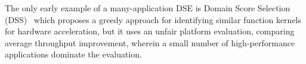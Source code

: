 The only early example of a many-application DSE is Domain Score Selection (DSS)~\cite{zhang2018ds} which proposes a greedy approach for identifying similar function kernels for hardware acceleration, but it uses an unfair platform evaluation, comparing average throughput improvement, wherein a small number of high-performance applications dominate the evaluation. 



